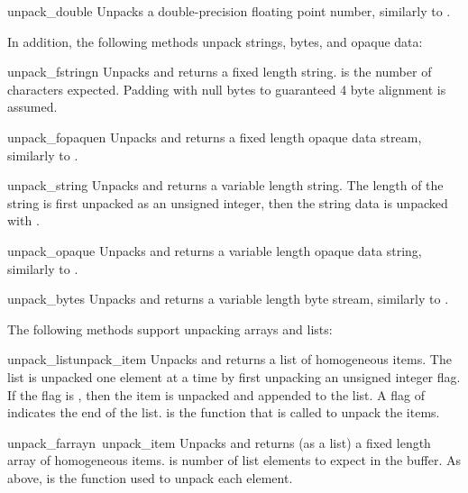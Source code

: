 \begin{funcdesc}{unpack_double}{}
Unpacks a double-precision floating point number, similarly to
.
\end{funcdesc}

In addition, the following methods unpack strings, bytes, and opaque
data:

\begin{funcdesc}{unpack_fstring}{n}
Unpacks and returns a fixed length string.   is the number of
characters expected.  Padding with null bytes to guaranteed 4 byte
alignment is assumed.
\end{funcdesc}

\begin{funcdesc}{unpack_fopaque}{n}
Unpacks and returns a fixed length opaque data stream, similarly to
.
\end{funcdesc}

\begin{funcdesc}{unpack_string}{}
Unpacks and returns a variable length string.  The length of the
string is first unpacked as an unsigned integer, then the string data
is unpacked with .
\end{funcdesc}

\begin{funcdesc}{unpack_opaque}{}
Unpacks and returns a variable length opaque data string, similarly to
.
\end{funcdesc}

\begin{funcdesc}{unpack_bytes}{}
Unpacks and returns a variable length byte stream, similarly to
.
\end{funcdesc}

The following methods support unpacking arrays and lists:

\begin{funcdesc}{unpack_list}{unpack_item}
Unpacks and returns a list of homogeneous items.  The list is unpacked
one element at a time
by first unpacking an unsigned integer flag.  If the flag is ,
then the item is unpacked and appended to the list.  A flag of
 indicates the end of the list.   is the
function that is called to unpack the items.
\end{funcdesc}

\begin{funcdesc}{unpack_farray}{n\, unpack_item}
Unpacks and returns (as a list) a fixed length array of homogeneous
items.   is number of list elements to expect in the buffer.
As above,  is the function used to unpack each element.
\end{funcdesc}

